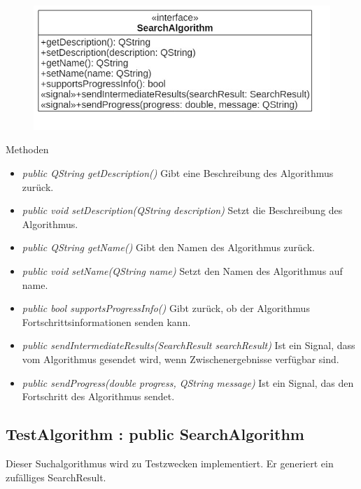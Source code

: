 \begin{figure}[H]
\centering
\includegraphics[scale=0.5]{img/Klassendiagramm/Klassen/SearchAlgorithm}
\label{fig:searchAlgorithm}
\end{figure}

Methoden
\begin{itemize}
\item\textit{public QString getDescription()} Gibt eine Beschreibung des Algorithmus zurück.
\item\textit{public void setDescription(QString description)} Setzt die Beschreibung des Algorithmus.
\item\textit{public QString getName()} Gibt den Namen des Algorithmus zurück.
\item\textit{public void setName(QString name)} Setzt den Namen des Algorithmus auf name.
\item\textit{public bool supportsProgressInfo()} Gibt zurück, ob der Algorithmus Fortschrittsinformationen senden kann.
\item\textit{public sendIntermediateResults(SearchResult searchResult)} Ist ein Signal, dass vom Algorithmus gesendet wird, wenn Zwischenergebnisse verfügbar sind.
\item\textit{public sendProgress(double progress, QString message)} Ist ein Signal, das den Fortschritt des Algorithmus sendet.
\end{itemize}

\subsection*{TestAlgorithm : public SearchAlgorithm}
Dieser Suchalgorithmus wird zu Testzwecken implementiert. Er generiert ein zufälliges SearchResult.

